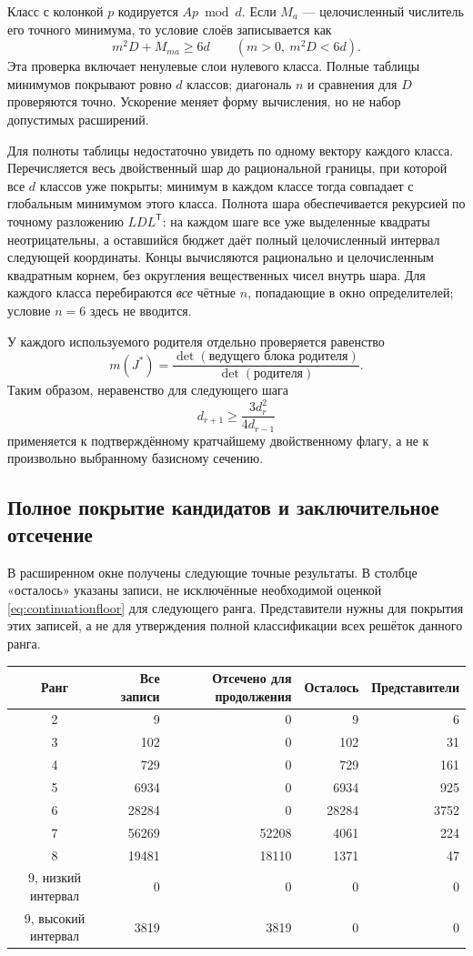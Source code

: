 \documentclass[11pt,a4paper]{article}
\theoremstyle{remark}\newtheorem{remark}[theorem]{Замечание}
\begin{document}
Класс с колонкой $p$ кодируется $Ap\bmod d$. Если $M_a$ --- целочисленный числитель его точного минимума, то условие слоёв записывается как
\begin{equation}\label{eq:integerlayertest}
m^2D+M_{ma}\ge6d
\qquad(m>0,\ m^2D<6d).
\end{equation}
Эта проверка включает ненулевые слои нулевого класса. Полные таблицы минимумов покрывают ровно $d$ классов; диагональ $n$ и сравнения для $D$ проверяются точно. Ускорение меняет форму вычисления, но не набор допустимых расширений.

Для полноты таблицы недостаточно увидеть по одному вектору каждого класса. Перечисляется весь двойственный шар до рациональной границы, при которой все $d$ классов уже покрыты; минимум в каждом классе тогда совпадает с глобальным минимумом этого класса. Полнота шара обеспечивается рекурсией по точному разложению $LDL^{\mathsf T}$: на каждом шаге все уже выделенные квадраты неотрицательны, а оставшийся бюджет даёт полный целочисленный интервал следующей координаты. Концы вычисляются рационально и целочисленным квадратным корнем, без округления вещественных чисел внутрь шара. Для каждого класса перебираются \emph{все} чётные $n$, попадающие в окно определителей; условие $n=6$ здесь не вводится.

У каждого используемого родителя отдельно проверяется равенство
\[
m(J^*)=
\frac{\det(\text{ведущего блока родителя})}{\det(\text{родителя})}.
\]
Таким образом, неравенство для следующего шага
\begin{equation}\label{eq:continuationfloor}
d_{r+1}\ge\frac{3d_r^2}{4d_{r-1}}
\end{equation}
применяется к подтверждённому кратчайшему двойственному флагу, а не к произвольно выбранному базисному сечению.

\subsection{Полное покрытие кандидатов и заключительное отсечение}

В расширенном окне получены следующие точные результаты. В столбце «осталось» указаны записи, не исключённые необходимой оценкой \eqref{eq:continuationfloor} для следующего ранга. Представители нужны для покрытия этих записей, а не для утверждения полной классификации всех решёток данного ранга.
\begin{center}
\begin{tabular}{crrrr}
\toprule
Ранг & Все записи & Отсечено для продолжения & Осталось & Представители\\\midrule
2&9&0&9&6\\
3&102&0&102&31\\
4&729&0&729&161\\
5&6934&0&6934&925\\
6&28284&0&28284&3752\\
7&56269&52208&4061&224\\
8&19481&18110&1371&47\\
9, низкий интервал&0&0&0&0\\
9, высокий интервал&3819&3819&0&0\\
\bottomrule
\end{tabular}
\end{center}
\end{document}
